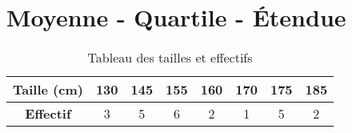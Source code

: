 \documentclass{article}
\begin{document}
\newpage
\section{\textbf{Moyenne - Quartile - Étendue}} 


\begin{table}[h!]
    \centering
    \begin{tabular}{|c|c|c|c|c|c|c|c|} %
        \hline
        \textbf{Taille (cm)} & 130 & 145 & 155 & 160 & 170 & 175 & 185 \\ \hline
        \textbf{Effectif}     & 3  & 5  & 6 & 2 & 1  & 5 & 2  \\ \hline
    \end{tabular}
    \caption{Tableau des tailles et effectifs}
\end{table}
\end{document}
